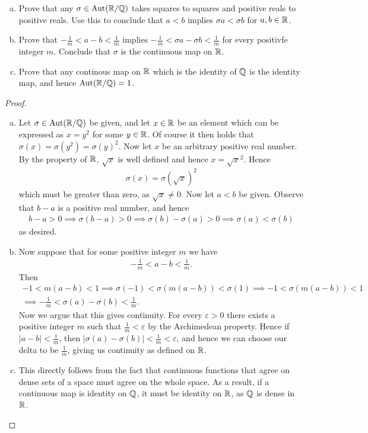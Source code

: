 \documentclass[num=10,duedate=04-14-21,course=Algebra\ II,proflastname=Walton]{hwtemplate}
\begin{document}
\problem[6]
\begin{claim}
	\begin{enumerate}[(a).]
	\item Prove that any \(\sigma \in \textrm{Aut}(\mathbb{R} / \mathbb{Q})\) takes squares to squares and positive reals to positive reals. Use this to conclude that \(a<b\) implies \(\sigma a < \sigma b\) for \(a,b \in \mathbb{R}\).
	\item Prove that \(-\frac{1}{m}<a-b<\frac{1}{m}\) implies \(-\frac{1}{m}<\sigma a-\sigma b<\frac{1}{m}\) for every positivfe integer \(m\). Conclude that \(\sigma \) is the continuous map on \(\mathbb{R}\).
	\item Prove that any continous map on \(\mathbb{R}\) which is the identity of \(\mathbb{Q}\) is the identity map, and hence \(\textrm{Aut}(\mathbb{R}/\mathbb{Q})=1\).
	\end{enumerate}
\end{claim}
\begin{proof}
	\begin{enumerate}[(a).]
		\item Let \(\sigma \in \textrm{Aut}(\mathbb{R} / \mathbb{Q})\) be given, and let \(x \in \mathbb{R}\) be an element which can be expressed as \(x=y^2\) for some \(y \in \mathbb{R}\). Of course it then holds that \(\sigma (x) = \sigma (y^2) = \sigma(y)^2\). Now let \(x\) be an arbitrary positive real number. By the property of \(\mathbb{R}\),  \(\sqrt{x} \) is well defined and hence \(x = \sqrt{x} ^2\). Hence
			\begin{align*}
				\sigma (x) = \sigma (\sqrt{x} )^2
			\end{align*}
			which must be greater than zero, as \(\sqrt{x } \neq 0\). Now let \(a<b\) be given. Observe that \(b-a\) is a positive real number, and hence
			\begin{align*}
				b-a>0 \implies \sigma (b-a)>0 \implies \sigma (b) - \sigma (a) > 0 \implies \sigma (a) < \sigma (b)
			\end{align*}
			as desired.
		\item Now suppose that for some positive integer \(m\) we have
			\begin{align*}
				-\frac{1}{m}< a-b < \frac{1}{m}.
			\end{align*}
			Then
			\begin{align*}
				-1 < m(a-b)<1 \implies \sigma (-1) < \sigma (m(a-b)) < \sigma (1) \implies -1 < \sigma (m(a-b))<1\\
				\implies -\frac{1}{m} < \sigma (a)-\sigma (b) < \frac{1}{m}.
			\end{align*}
			Now we argue that this gives continuity. For every \(\varepsilon>0\) there exists a positive integer \(m\) such that \(\frac{1}{m}< \varepsilon\) by the Archimedean property. Hence if \(\left| a-b \right| < \frac{1}{m}\), then \(\left| \sigma (a)-\sigma (b) \right| < \frac{1}{m} < \varepsilon\), and hence we can choose our delta to be \(\frac{1}{m}\), giving us continuity as defined on \(\mathbb{R}\).
		\item This directly follows from the fact that continuous functions that agree on dense sets of a space must agree on the whole space. As a result, if a continuous map is identity on \(\mathbb{Q}\), it must be identity on \(\mathbb{R}\), as \(\mathbb{Q}\) is dense in \(\mathbb{R}\).
	\end{enumerate}
\end{proof}
\end{document}

